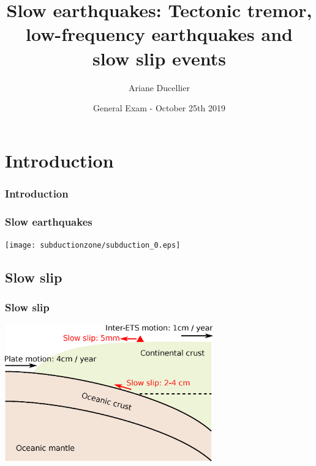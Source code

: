 \documentclass{beamer}
\title[Tectonic tremor, low-frequency earthquakes and slow slip events]{Slow earthquakes: Tectonic tremor, low-frequency earthquakes and slow slip events}
\author{Ariane Ducellier}
\institute{University of Washington}
\date{General Exam - October 25th 2019}
\begin{document}
	\begin{frame}
		\titlepage
	\end{frame}


	\section{Introduction}

	\begin{frame}
		\frametitle{Introduction}
	\end{frame}

	\begin{frame}
		\frametitle{Slow earthquakes}
		\begin{center}
			\texttt{[image: subductionzone/subduction\_0.eps]}
		\end{center}
	\end{frame}


	\subsection{Slow slip}

	\begin{frame}
		\frametitle{Slow slip}
		\begin{center}
			\includegraphics[trim={0cm 0cm 0cm 0cm}, clip, width=9cm]{ETS/slow_slip.eps}
		\end{center}
	\end{frame}
\end{document}
